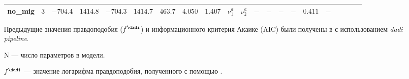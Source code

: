 \begin{landscape}
\begin{table}
{\begin{tabular}{lcccccccccccccccccccc}
no\_mig & $3$ & $-704.4$ & $1414.8$ & $\mathbf{-704.3}$ & $1414.7$ & %
$463.7$ & $4.050$ & $1.407$ & $\nu_1^a$ & $\nu_2^a$ & $-$ & $-$ & $-$ & $-$ & $0.411$ & $-$ \\
\hline
\end{tabular}%
}
\begin{tablenotes}
\item Предыдущие значения правдоподобия ($f^{\text{\dadi}}$) и информационного критерия Акаике (AIC) были получены в \cite{portik2017evaluating} с использованием \textit{dadi-pipeline}.
\item N --- число параметров в модели.
\item $f^\text{\dadi}$ --- значение логарифма правдоподобия, полученного с помощью \dadi.
\end{tablenotes}
\label{tab:app1:cvln_cvls}
\end{table}


\begin{table}
\caption{Результаты вывода демографической истории для популяций CrossRiver и CVLN кошачьей лягушки с использованием двенадцати моделей из каталога \textit{dadi-pipeline}~\cite{portik2017evaluating}}
\end{table}
\end{landscape}
